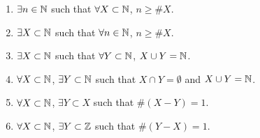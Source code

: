 \begin{enumerate}
  \begin{enumerate}
      \item $\exists n \in \mathbb{N}$ such that $\forall X \subset \mathbb{N}$, $n \geq \# X$.
      \item $\exists X \subset \mathbb{N}$ such that $\forall n \in \mathbb{N}$, $n \geq \# X$.
      \item $\exists X \subset \mathbb{N}$ such that $\forall Y \subset \mathbb{N}$, $X \cup Y= \mathbb{N}$.
      \item $\forall X \subset \mathbb{N}$, $\exists Y \subset \mathbb{N}$ such that $X \cap Y = \emptyset$ and $X \cup Y = \mathbb{N}$.
      \item $\forall X \subset \mathbb{N}$, $\exists Y \subset X$ such that $\# (X - Y) = 1$.
      \item $\forall X \subset \mathbb{N}$, $\exists Y \subset \mathbb{Z}$ such that $\# (Y - X) = 1$.
  \end{enumerate}
\end{enumerate}
